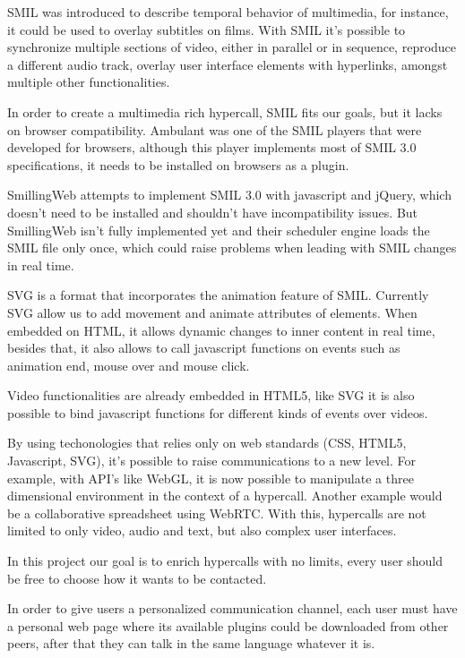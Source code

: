 \documentclass[11pt,twocolumn]{article}
\begin{document}
  SMIL was introduced to describe temporal behavior of multimedia, for instance, it could be used to overlay subtitles on films. With SMIL it's possible to synchronize multiple sections of video, either in parallel or in sequence, reproduce a different audio track, overlay user interface elements with hyperlinks, amongst multiple other functionalities.

  In order to create a multimedia rich hypercall, SMIL fits our goals, but it lacks on browser compatibility. Ambulant \cite{ambulant} was one of the SMIL players that were developed for browsers, although this player implements most of SMIL 3.0 specifications, it needs to be installed on browsers as a plugin.

  SmillingWeb \cite{smillingweb} attempts to implement SMIL 3.0 with javascript and jQuery, which doesn't need to be installed and shouldn't have incompatibility issues. But SmillingWeb isn't fully implemented yet and their scheduler engine loads the SMIL file only once, which could raise problems when leading with SMIL changes in real time.  

  SVG is a format that incorporates the animation feature of SMIL. Currently SVG allow us to add movement and animate attributes of elements. When embedded on HTML, it allows dynamic changes to inner content in real time, besides that, it also allows to call javascript functions on events such as animation end, mouse over and mouse click.

  Video functionalities are already embedded in HTML5, like SVG it is also possible to bind javascript functions for different kinds of events over videos.

  By using techonologies that relies only on web standards (CSS, HTML5, Javascript, SVG), it's possible to raise communications to a new level. For example, with API's like WebGL, it is now possible to manipulate a three dimensional environment in the context of a hypercall. Another example would be a collaborative spreadsheet using WebRTC. With this, hypercalls are not limited to only video, audio and text, but also complex user interfaces.

  In this project our goal is to enrich hypercalls with no limits, every user should be free to choose how it wants to be contacted.

  In order to give users a personalized communication channel, each user must have a personal web page where its available plugins could be downloaded from other peers, after that they can talk in the same language whatever it is.
\end{document}
